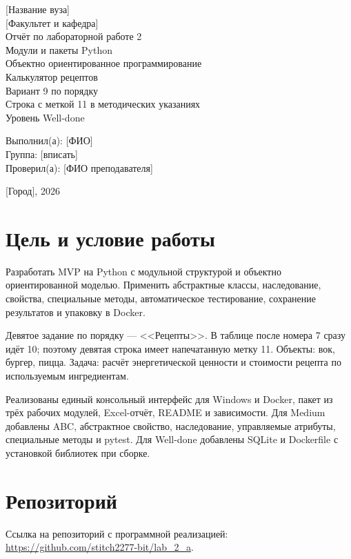 \documentclass[12pt,a4paper]{article}
\begin{document}
\begin{titlepage}
\begin{center}
[Название вуза]\\[0.5cm]
[Факультет и кафедра]\\[3cm]
{\Large Отчёт по лабораторной работе 2}\\[0.5cm]
{\large Модули и пакеты Python}\\
{\large Объектно ориентированное программирование}\\[1cm]
Калькулятор рецептов\\[0.4cm]
Вариант 9 по порядку\\
Строка с меткой 11 в методических указаниях\\
Уровень Well-done
\end{center}
\vfill
\begin{flushright}
Выполнил(а): [ФИО]\\
Группа: [вписать]\\[0.5cm]
Проверил(а): [ФИО преподавателя]
\end{flushright}
\vfill
\begin{center}
[Город], 2026
\end{center}
\end{titlepage}
\tableofcontents
\newpage

\section{Цель и условие работы}
Разработать MVP на Python с модульной структурой и объектно ориентированной моделью.
Применить абстрактные классы, наследование, свойства, специальные методы,
автоматическое тестирование, сохранение результатов и упаковку в Docker.

Девятое задание по порядку --- <<Рецепты>>. В таблице после номера 7 сразу идёт 10;
поэтому девятая строка имеет напечатанную метку 11.
Объекты: вок, бургер, пицца. Задача: расчёт энергетической ценности и стоимости
рецепта по используемым ингредиентам.

Реализованы единый консольный интерфейс для Windows и Docker,
пакет из трёх рабочих модулей, Excel-отчёт,
README и зависимости. Для Medium добавлены ABC, абстрактное свойство,
наследование, управляемые атрибуты, специальные методы и pytest.
Для Well-done добавлены SQLite и Dockerfile с установкой библиотек при сборке.

\section{Репозиторий}
Ссылка на репозиторий с программной реализацией: \url{https://github.com/stitch2277-bit/lab_2_a}.
\end{document}

